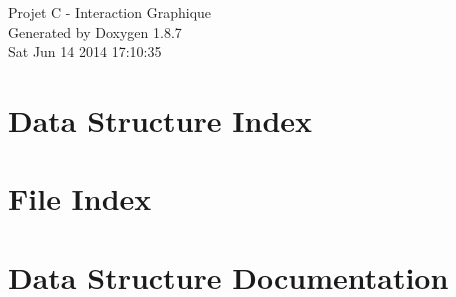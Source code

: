 \documentclass[twoside]{book}
\newcommand{\+}{\discretionary{\mbox{\scriptsize$\hookleftarrow$}}{}{}}
\newcommand{\clearemptydoublepage}{%
  \newpage{\pagestyle{empty}\cleardoublepage}%
}
\begin{document}
\hypersetup{pageanchor=false,
             bookmarks=true,
             bookmarksnumbered=true,
             pdfencoding=unicode
            }
\begin{titlepage}
\vspace*{7cm}
\begin{center}%
{\Large Projet C -\/ Interaction Graphique }\\
\vspace*{1cm}
{\large Generated by Doxygen 1.8.7}\\
\vspace*{0.5cm}
{\small Sat Jun 14 2014 17:10:35}\\
\end{center}
\end{titlepage}
\clearemptydoublepage
\tableofcontents
\clearemptydoublepage
{}
\hypersetup{pageanchor=true}

\chapter{Data Structure Index}

\chapter{File Index}

\chapter{Data Structure Documentation}





















\end{document}
